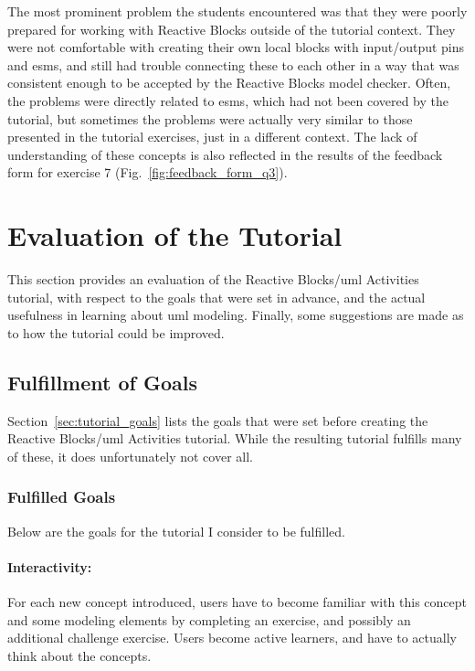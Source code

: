 \noindent
The most prominent problem the students encountered was that they were poorly prepared for working with Reactive Blocks outside of the tutorial context. They were not comfortable with creating their own local blocks with input/output pins and \glspl{esm}, and still had trouble connecting these to each other in a way that was consistent enough to be accepted by the Reactive Blocks model checker. Often, the problems were directly related to \glspl{esm}, which had not been covered by the tutorial, but sometimes the problems were actually very similar to those presented in the tutorial exercises, just in a different context. The lack of understanding of these concepts is also reflected in the results of the feedback form for exercise 7 (Fig.~\ref{fig:feedback_form_q3}).

\section{Evaluation of the Tutorial}
\label{sec:tutorial_evaluation}
This section provides an evaluation of the Reactive Blocks/\gls{uml} Activities tutorial, with respect to the goals that were set in advance, and the actual usefulness in learning about \gls{uml} modeling. Finally, some suggestions are made as to how the tutorial could be improved.

\subsection{Fulfillment of Goals}
\label{sec:tutorial_goal_fulfillment}
Section~\ref{sec:tutorial_goals} lists the goals that were set before creating the Reactive Blocks/\gls{uml} Activities tutorial. While the resulting tutorial fulfills many of these, it does unfortunately not cover all.

\subsubsection{Fulfilled Goals}
Below are the goals for the tutorial I consider to be fulfilled.

\paragraph{Interactivity:} For each new concept introduced, users have to become familiar with this concept and some modeling elements by completing an exercise, and possibly an additional challenge exercise. Users become active learners, and have to actually think about the concepts.

